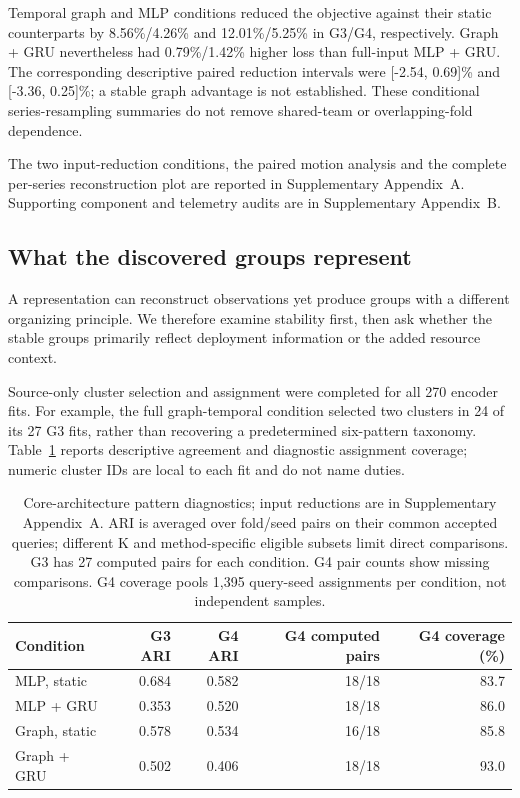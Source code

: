 Temporal graph and MLP conditions reduced the objective against their static counterparts by 8.56\%/4.26\% and 12.01\%/5.25\% in G3/G4, respectively. Graph + GRU nevertheless had 0.79\%/1.42\% higher loss than full-input MLP + GRU. The corresponding descriptive paired reduction intervals were [-2.54, 0.69]\% and [-3.36, 0.25]\%; a stable graph advantage is not established. These conditional series-resampling summaries do not remove shared-team or overlapping-fold dependence. %

The two input-reduction conditions, the paired motion analysis and the complete per-series reconstruction plot are reported in Supplementary Appendix~A. Supporting component and telemetry audits are in Supplementary Appendix~B.

\subsection{What the discovered groups represent}
A representation can reconstruct observations yet produce groups with a different organizing principle. We therefore examine stability first, then ask whether the stable groups primarily reflect deployment information or the added resource context.

Source-only cluster selection and assignment were completed for all 270 encoder fits. For example, the full graph-temporal condition selected two clusters in 24 of its 27 G3 fits, rather than recovering a predetermined six-pattern taxonomy. Table~\ref{tab:stability} reports descriptive agreement and diagnostic assignment coverage; numeric cluster IDs are local to each fit and do not name duties. %

\begin{table}[t]
\caption{Core-architecture pattern diagnostics; input reductions are in Supplementary Appendix~A. ARI is averaged over fold/seed pairs on their common accepted queries; different K and method-specific eligible subsets limit direct comparisons. G3 has 27 computed pairs for each condition. G4 pair counts show missing comparisons. G4 coverage pools 1,395 query-seed assignments per condition, not independent samples.}
\label{tab:stability}
\centering\small
\begin{tabular}{lrrrr}
\toprule
Condition & G3 ARI & G4 ARI & G4 computed pairs & G4 coverage (\%)\\
\midrule
MLP, static & 0.684 & 0.582 & 18/18 & 83.7 \\ %
MLP + GRU & 0.353 & 0.520 & 18/18 & 86.0 \\ %
Graph, static & 0.578 & 0.534 & 16/18 & 85.8 \\ %
Graph + GRU & 0.502 & 0.406 & 18/18 & 93.0 \\ %
\bottomrule
\end{tabular}
\end{table}

